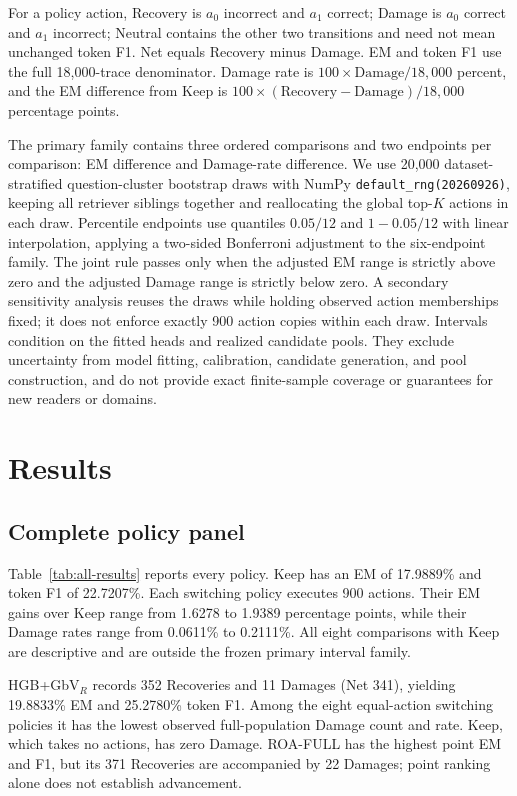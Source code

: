 \documentclass[11pt]{article}
\newcommand{\damage}{\mathrm{Damage}}
\newcommand{\recovery}{\mathrm{Recovery}}
\begin{document}
For a policy action, Recovery is $a_0$ incorrect and $a_1$ correct; Damage is $a_0$ correct and $a_1$ incorrect; Neutral contains the other two transitions and need not mean unchanged token F1. Net equals Recovery minus Damage. EM and token F1 use the full 18,000-trace denominator. Damage rate is $100\times\damage/18{,}000$ percent, and the EM difference from Keep is $100\times(\recovery-\damage)/18{,}000$ percentage points.

The primary family contains three ordered comparisons and two endpoints per comparison: EM difference and Damage-rate difference. We use 20,000 dataset-stratified question-cluster bootstrap draws with NumPy \texttt{default\_rng(20260926)}, keeping all retriever siblings together and reallocating the global top-$K$ actions in each draw. Percentile endpoints use quantiles $0.05/12$ and $1-0.05/12$ with linear interpolation, applying a two-sided Bonferroni adjustment to the six-endpoint family. The joint rule passes only when the adjusted EM range is strictly above zero and the adjusted Damage range is strictly below zero. A secondary sensitivity analysis reuses the draws while holding observed action memberships fixed; it does not enforce exactly 900 action copies within each draw. Intervals condition on the fitted heads and realized candidate pools. They exclude uncertainty from model fitting, calibration, candidate generation, and pool construction, and do not provide exact finite-sample coverage or guarantees for new readers or domains.

\section{Results}
\subsection{Complete policy panel}
Table~\ref{tab:all-results} reports every policy. Keep has an EM of 17.9889\% and token F1 of 22.7207\%. Each switching policy executes 900 actions. Their EM gains over Keep range from 1.6278 to 1.9389 percentage points, while their Damage rates range from 0.0611\% to 0.2111\%. All eight comparisons with Keep are descriptive and are outside the frozen primary interval family.

HGB+GbV$_R$ records 352 Recoveries and 11 Damages (Net 341), yielding 19.8833\% EM and 25.2780\% token F1. Among the eight equal-action switching policies it has the lowest observed full-population Damage count and rate. Keep, which takes no actions, has zero Damage. ROA-FULL has the highest point EM and F1, but its 371 Recoveries are accompanied by 22 Damages; point ranking alone does not establish advancement.
\end{document}

